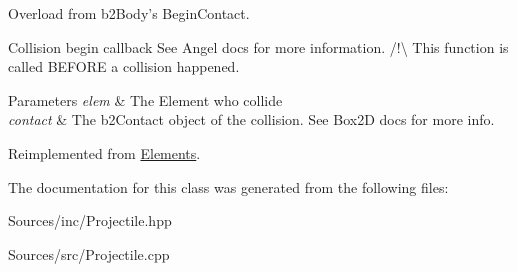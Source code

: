 Overload from b2\+Body's Begin\+Contact. 

Collision begin callback See Angel docs for more information. /!\textbackslash{} This function is called B\+E\+F\+O\+R\+E a collision happened. 
\begin{DoxyParams}{Parameters}
{\em elem} & The Element who collide \\
\hline
{\em contact} & The b2\+Contact object of the collision. See Box2\+D docs for more info. \\
\hline
\end{DoxyParams}


Reimplemented from \hyperlink{class_elements}{Elements}.



The documentation for this class was generated from the following files\+:\begin{DoxyCompactItemize}
\item 
Sources/inc/Projectile.\+hpp\item 
Sources/src/Projectile.\+cpp\end{DoxyCompactItemize}

